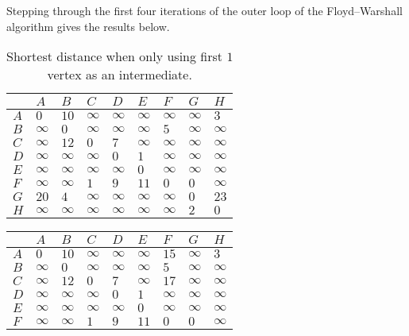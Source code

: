 \begin{solution}
Stepping through the first four iterations of the outer loop of the Floyd--Warshall algorithm gives the results below.
\begin{table}[H]
    \centering
\begin{tabular}{|l|l|l|l|l|l|l|l|l|}
\hline
 & $A$ & $B$ & $C$ & $D$ & $E$ & $F$ & $G$ & $H$ \\ \hline
$A$ & $0$ & $10$ & $\infty$ & $\infty$ & $\infty$ & $\infty$ & $\infty$ & $3$ \\ \hline
$B$    & $\infty$ & $0$ & $\infty$ & $\infty$ & $\infty$ & $5$ & $\infty$ & $\infty$ \\ \hline
$C$    & $\infty$ & $12$ & $0$ & $7$ & $\infty$ & $\infty$ & $\infty$ & $\infty$ \\ \hline
$D$    & $\infty$ & $\infty$ & $\infty$ & $0$ & $1$ & $\infty$ & $\infty$ & $\infty$ \\ \hline
$E$    & $\infty$ & $\infty$ & $\infty$ & $\infty$ & $0$ & $\infty$ & $\infty$ & $\infty$ \\ \hline
$F$    & $\infty$ & $\infty$ & $1$ & $9$ & $11$ & $0$ & $0$ & $\infty$ \\ \hline
$G$    & $20$ & $4$ & $\infty$ & $\infty$ & $\infty$ & $\infty$ & $0$ & $23$ \\ \hline
$H$    & $\infty$ & $\infty$ & $\infty$ & $\infty$ & $\infty$ & $\infty$ & $2$ & $0$ \\ \hline
\end{tabular}
\caption{Shortest distance when only using first $1$ vertex as an intermediate.}
\end{table}
\begin{table}[H]
    \centering
\begin{tabular}{|l|l|l|l|l|l|l|l|l|}
\hline
 & $A$ & $B$ & $C$ & $D$ & $E$ & $F$ & $G$ & $H$ \\ \hline
$A$ & $0$ & $10$ & $\infty$ & $\infty$ & $\infty$ & $15$ & $\infty$ & $3$ \\ \hline
$B$    & $\infty$ & $0$ & $\infty$ & $\infty$ & $\infty$ & $5$ & $\infty$ & $\infty$ \\ \hline
$C$    & $\infty$ & $12$ & $0$ & $7$ & $\infty$ & $17$ & $\infty$ & $\infty$ \\ \hline
$D$    & $\infty$ & $\infty$ & $\infty$ & $0$ & $1$ & $\infty$ & $\infty$ & $\infty$ \\ \hline
$E$    & $\infty$ & $\infty$ & $\infty$ & $\infty$ & $0$ & $\infty$ & $\infty$ & $\infty$ \\ \hline
$F$    & $\infty$ & $\infty$ & $1$ & $9$ & $11$ & $0$ & $0$ & $\infty$ \\ \hline

\end{tabular}
\end{table}
\end{solution}
